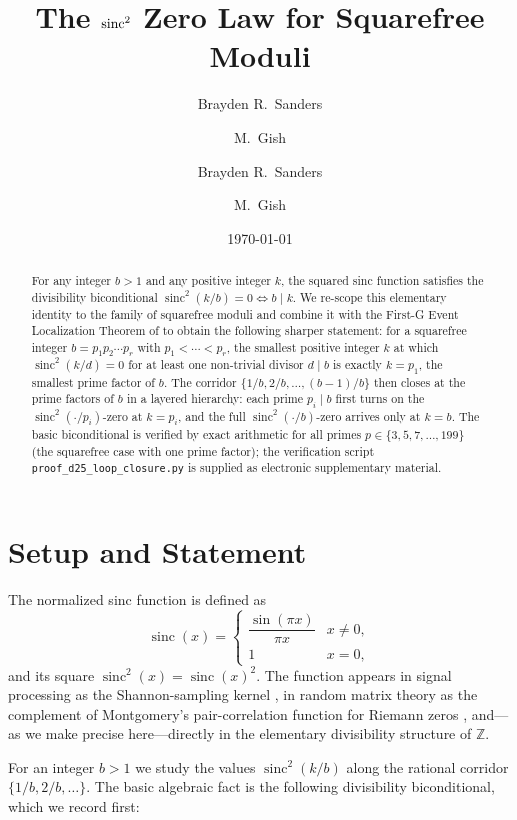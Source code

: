 \documentclass[11pt,reqno]{amsart}
\title[The sinc\texorpdfstring{$^2$}{\^{}2} zero law for squarefree moduli]{The \texorpdfstring{$\sinc^2$}{sinc\^{}2} Zero Law for Squarefree Moduli}
\author{Brayden R.\ Sanders \and M.\ Gish}
\author{Brayden R.\ Sanders \and M.\ Gish}
\date{\today}
\theoremstyle{plain}
\theoremstyle{remark}
\DeclareMathOperator{\sinc}{sinc}
\newcommand{\Z}{\mathbb{Z}}
\begin{document}
\begin{abstract}
For any integer $b > 1$ and any positive integer $k$, the squared
sinc function satisfies the divisibility biconditional
$\sinc^2(k/b) = 0 \iff b \mid k$. We re-scope this elementary
identity to the family of squarefree moduli and combine it with the
First-G Event Localization Theorem of \cite{J04} to obtain the
following sharper statement: for a squarefree integer
$b = p_1 p_2 \cdots p_r$ with $p_1 < \cdots < p_r$, the smallest
positive integer $k$ at which $\sinc^2(k/d) = 0$ for at least one
non-trivial divisor $d \mid b$ is exactly $k = p_1$, the smallest
prime factor of $b$. The corridor
$\{1/b, 2/b, \ldots, (b-1)/b\}$ then closes at the prime factors of
$b$ in a layered hierarchy: each prime $p_i \mid b$ first turns on
the $\sinc^2(\cdot/p_i)$-zero at $k = p_i$, and the full
$\sinc^2(\cdot/b)$-zero arrives only at $k = b$. The basic
biconditional is verified by exact arithmetic for all primes
$p \in \{3, 5, 7, \ldots, 199\}$ (the squarefree case with one prime
factor); the verification script
\texttt{proof\_d25\_loop\_closure.py} is supplied as electronic
supplementary material.
\end{abstract}

\maketitle

\section{Setup and Statement}\label{sec:setup}

The normalized sinc function is defined as
\begin{equation}\label{eq:sinc-def}
  \sinc(x) =
  \begin{cases}
     \dfrac{\sin(\pi x)}{\pi x} & x \neq 0,\\[4pt]
     1 & x = 0,
  \end{cases}
\end{equation}
and its square $\sinc^2(x) = \sinc(x)^2$. The function appears in
signal processing as the Shannon-sampling kernel
\cite{Shannon1949}, in random matrix theory as the complement of
Montgomery's pair-correlation function for Riemann zeros
\cite{Montgomery1973}, and---as we make precise here---directly in
the elementary divisibility structure of $\Z$.

For an integer $b > 1$ we study the values $\sinc^2(k/b)$ along the
rational corridor $\{1/b, 2/b, \ldots\}$. The basic algebraic fact
is the following divisibility biconditional, which we record first:
\end{document}
